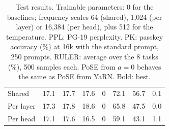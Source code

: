 \begin{table}[t]
\begin{tabular}{@{}l rrr r rrr@{}}
\quad Shared      & 17.1 & 17.7 & 17.6 & 0 & 72.1 & 56.7 & 0.1 \\
\quad Per layer   & 17.3 & 17.8 & 18.6 & 0 & 65.8 & 47.5 & 0.0 \\
\quad Per head    & 17.1 & 17.6 & 16.5 & 0 & 59.1 & 43.1 & 1.1 \\
\bottomrule
\end{tabular}
\caption{Test results. Trainable parameters: 0 for the baselines; frequency scales
64 (shared), 1,024 (per layer) or 16,384 (per head), plus 512 for the temperature.
PPL: PG-19 perplexity. PK: passkey accuracy (\%) at 16k with the standard prompt, 250 prompts.
RULER: average over the 8 tasks (\%), 500 samples each.
PoSE from $a{=}0$ behaves the same as PoSE from YaRN.
Bold: best.}
\label{tab:main}
\end{table}
